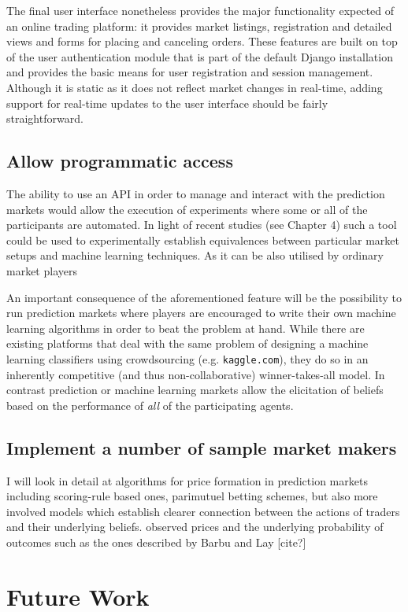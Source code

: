 \documentclass[bsc,frontabs,twoside,singlespacing,parskip,deptreport]{infthesis}     %
\begin{document}
    The final user interface nonetheless provides the major functionality expected of an online trading platform: it provides market listings, registration and detailed views and forms for placing and canceling orders. These features are built on top of the user authentication module that is part of the default Django installation and provides the basic means for user registration and session management. Although it is static as it does not reflect market changes in real-time, adding support for real-time updates to the user interface should be fairly straightforward.
    

\subsection{Allow programmatic access}
    The ability to use an API in order to manage and interact with the prediction markets would allow the execution of experiments where some or all of the participants are automated. In light of recent studies (see Chapter 4) such a tool could be used to experimentally establish equivalences between particular market setups and machine learning techniques. As it can be also utilised by ordinary market players

    An important consequence of the aforementioned  feature will be the possibility to run prediction markets where players are encouraged to write their own machine learning algorithms in order to beat the problem at hand. While there are existing platforms that deal with the same problem of designing a machine learning classifiers using crowdsourcing (e.g. {\tt kaggle.com}), they do so in an inherently competitive (and thus non-collaborative) winner-takes-all model. In contrast prediction or machine learning markets allow the elicitation of beliefs based on the performance of {\em all} of the participating agents.
    
    
\subsection{Implement a number of sample market makers}
I will look in detail at algorithms for price formation in prediction markets including scoring-rule based ones, parimutuel betting schemes, but also more involved models which establish clearer connection between the actions of traders and their underlying beliefs. observed prices and the underlying probability of outcomes such as the ones described by Barbu and Lay [cite?]

\section{Future Work}
\end{document}
